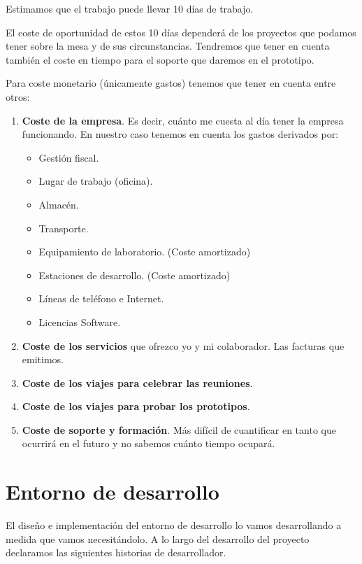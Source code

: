 Estimamos que el trabajo puede llevar 10 días de trabajo.

El coste de oportunidad de estos 10 días dependerá de los
proyectos que podamos tener sobre la mesa y de sus circunstancias.
Tendremos que tener en cuenta también el coste en tiempo
para el soporte que daremos en el prototipo.

Para coste monetario (únicamente gastos) tenemos que tener en cuenta
entre otros:

\begin{enumerate}
    \item \textbf{Coste de la empresa}. Es decir, cuánto me
          cuesta al día tener la empresa funcionando.
          En nuestro caso tenemos en cuenta los gastos
          derivados por:
        \begin{itemize}[noitemsep,nolistsep]
            \item Gestión fiscal.
            \item Lugar de trabajo (oficina).
            \item Almacén.
            \item Transporte.
            \item Equipamiento de laboratorio. (Coste amortizado)
            \item Estaciones de desarrollo. (Coste amortizado)
            \item Líneas de teléfono e Internet.
            \item Licencias Software.
        \end{itemize}
    \item \textbf{Coste de los servicios} que ofrezco yo y mi
          colaborador. Las facturas que emitimos.
    \item \textbf{Coste de los viajes para celebrar las reuniones}.
    \item \textbf{Coste de los viajes para probar los prototipos}.
    \item \textbf{Coste de soporte y formación}. Más difícil de cuantificar
          en tanto que ocurrirá en el futuro y no sabemos
          cuánto tiempo ocupará.
\end{enumerate}

\section{Entorno de desarrollo}

El diseño e implementación del entorno de desarrollo lo
vamos desarrollando a medida que vamos necesitándolo.
A lo largo del desarrollo del proyecto declaramos las
siguientes historias de desarrollador.

